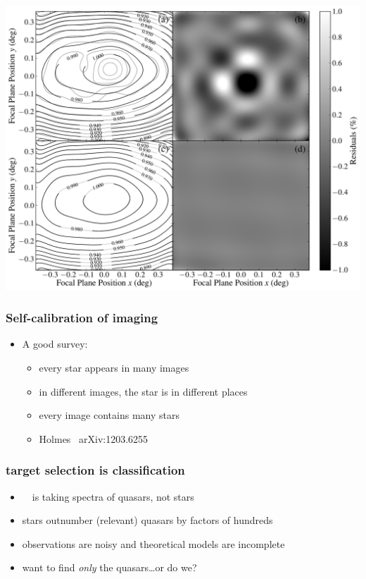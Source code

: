 \documentclass[pdftex]{beamer}
\begin{document}
\begin{frame}
\includegraphics[height=0.44\textheight]{./D_009_ff.pdf}
\end{frame}

\begin{frame}
  \frametitle{Self-calibration of imaging}
  \begin{itemize}
  \item A good survey:
    \begin{itemize}
    \item every star appears in many images
    \item in different images, the star is in different places
    \item every image contains many stars
    \item Holmes \etal\ arXiv:1203.6255
    \end{itemize}
  \end{itemize}
\end{frame}

\begin{frame}
  \frametitle{target selection is classification}
  \begin{itemize}
  \item \sdssiii\ \boss\ is taking spectra of quasars, not stars
  \item stars outnumber (relevant) quasars by factors of hundreds
  \item observations are noisy and theoretical models are incomplete
  \item want to find \emph{only} the quasars\ldots or do we?
  \end{itemize}
\end{frame}
\end{document}
